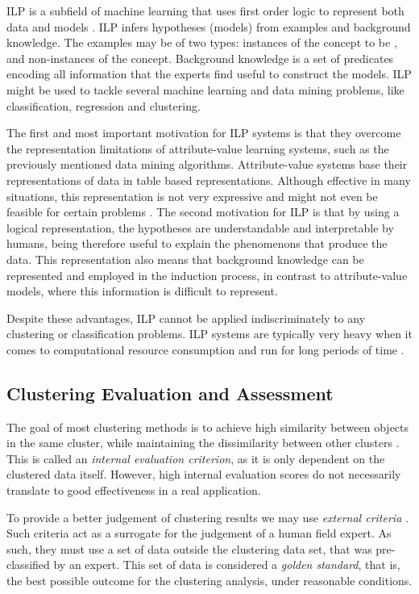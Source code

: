 ILP is a subfield of machine learning that uses first order logic to represent
both data and models \cite{Lavrac1998}. ILP infers hypotheses (models) from
examples and background knowledge. The examples may be of two types: instances
of the concept to be , and non-instances of the concept. Background
knowledge is a set of predicates encoding all information that the experts find
useful to construct the models. ILP might be used to tackle several machine
learning and data mining problems, like classification, regression and
clustering.

The first and most important motivation for ILP systems is that they overcome
the representation limitations of attribute-value learning systems, such as the
previously mentioned data mining algorithms. Attribute-value systems base their
representations of data in table based representations. Although effective in
many situations, this representation is not very expressive and might not even
be feasible for certain problems \cite{Bratko:1995:AIL:219717.219771}. The
second motivation for ILP is that by using a logical representation, the
hypotheses are understandable and interpretable by humans, being therefore
useful to explain the phenomenons that produce the data. This representation
also means that background knowledge can be represented and employed in the
induction process, in contrast to attribute-value models, where this information
is difficult to represent.

Despite these advantages, ILP cannot be applied indiscriminately to any
clustering or classification problems. ILP systems are typically very heavy when
it comes to computational resource consumption and run for long periods of time
\cite{fonseca2003implementation}.

\subsection{Clustering Evaluation and Assessment}\label{sec:clustereval}

The goal of most clustering methods is to achieve high similarity between
objects in the same cluster, while maintaining the dissimilarity between other
clusters \cite{Manning:2008:IIR:1394399}. This is called an \emph{internal
evaluation criterion}, as it is only dependent on the clustered data itself.
However, high internal evaluation scores do not necessarily translate to good
effectiveness in a real application.

To provide a better judgement of clustering results we may use \emph{external
criteria} \cite{Manning:2008:IIR:1394399}. Such criteria act as a surrogate for
the judgement of a human field expert. As such, they must use a set of data
outside the clustering data set, that was pre-classified by an expert. This set
of data is considered a \emph{golden standard}, that is, the best possible outcome for
the clustering analysis, under reasonable conditions.

